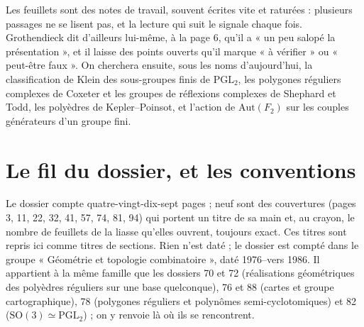 \documentclass[11pt,a4paper]{article}
\begin{document}
\begin{resume}
Les feuillets sont des notes de travail, souvent écrites vite et raturées :
plusieurs passages ne se lisent pas, et la lecture qui suit le signale chaque
fois. Grothendieck dit d'ailleurs lui-même, à la page 6, qu'il a « un peu
salopé la présentation », et il laisse des points ouverts qu'il marque
« à vérifier » ou « peut-être faux ». On cherchera ensuite, sous les noms
d'aujourd'hui, la classification de Klein des sous-groupes finis de
$\mathrm{PGL}_2$, les polygones réguliers complexes de Coxeter et les groupes
de réflexions complexes de Shephard et Todd, les polyèdres de Kepler--Poinsot,
et l'action de $\mathrm{Aut}(F_2)$ sur les couples générateurs d'un groupe fini.

\end{resume}

\section*{Le fil du dossier, et les conventions}

Le dossier compte quatre-vingt-dix-sept pages ; neuf sont des couvertures
(pages 3, 11, 22, 32, 41, 57, 74, 81, 94) qui portent un titre de sa main et,
au crayon, le nombre de feuillets de la liasse qu'elles ouvrent, toujours
exact. Ces titres sont repris ici comme titres de sections. Rien n'est daté ;
le dossier est compté dans le groupe « Géométrie et topologie combinatoire »,
daté 1976--vers 1986. Il appartient à la même famille que les dossiers 70 et
72 (réalisations géométriques des polyèdres réguliers sur une base
quelconque), 76 et 88 (cartes et groupe cartographique), 78 (polygones
réguliers et polynômes semi-cyclotomiques) et 82
($\mathrm{SO}(3) \simeq \mathrm{PGL}_2$) ; on y renvoie là où ils se
rencontrent.
\end{document}
